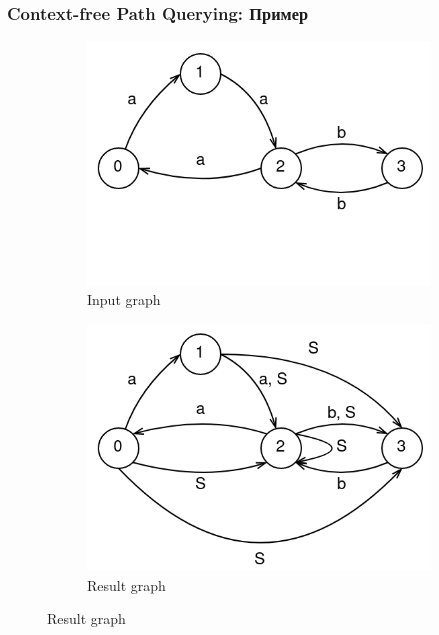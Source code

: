 \documentclass[xcolor=table,english]{beamer}
\begin{document}
\begin{frame}[fragile] \frametitle{Context-free Path Querying: Пример}
    \begin{minipage}[m]{\linewidth}
        \begin{figure}
            \centering
            \begin{subfigure}[b]{0.35\textwidth}
                \includegraphics[width=\textwidth]{figures/graph_cfpq_1.png}
                \caption{Input graph}
            \end{subfigure}
            \hfill
            \begin{subfigure}[b]{0.35\textwidth}
                \includegraphics[width=\textwidth]{figures/graph_cfpq_2.png}
                \caption{Result graph}
            \end{subfigure}

\end{figure}
\end{minipage}
\end{frame}
\end{document}
